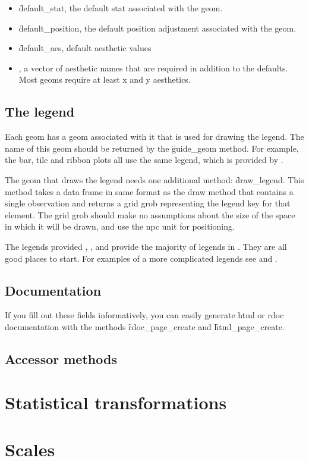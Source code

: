 \begin{itemize}
  \item \f{default_stat}, the default stat associated with the geom.
  
  \item \f{default_position}, the default position adjustment associated with the geom.

  \item \f{default_aes}, default aesthetic values
  
  \item {}, a vector of aesthetic names that are required in addition to the defaults.  Most geoms require at least x and y aesthetics.
  
\end{itemize}

\subsection{The legend}
\label{sub:the_legend}

Each geom has a geom associated with it that is used for drawing the legend.  The name of this geom should be returned by the \f{guide_geom} method.  For example, the bar, tile and ribbon plots all use the same legend, which is provided by .

The geom that draws the legend needs one additional method: \f{draw_legend}.  This method takes a data frame in same format as the draw method that contains a single observation and returns a grid grob representing the legend key for that element.  The grid grob should make no assumptions about the size of the space in which it will be drawn, and use the npc unit for positioning.

The legends provided , , and  provide the majority of legends in \ggplot.  They are all good places to start.  For examples of a more complicated legends see  and .

\subsection{Documentation} 
\label{sub:documentation}

If you fill out these fields informatively, you can easily generate html or rdoc documentation with the methods \f{rdoc_page_create} and \f{html_page_create}.

\subsection{Accessor methods}



\section{Statistical transformations}
\label{sec:own-stat}

\section{Scales}
\label{sec:own-scale}




